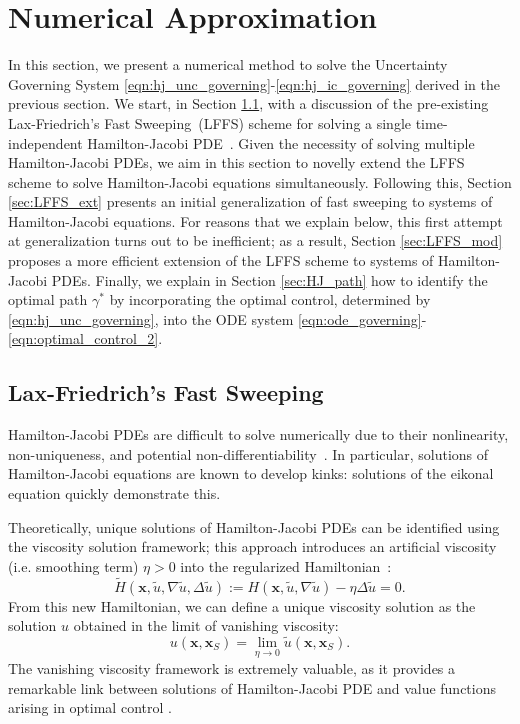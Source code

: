 \documentclass[pdflatex,sn-mathphys-num]{sn-jnl}%
\def \bx{{\mathbf {x}}}
\theoremstyle{thmstyleone}%
\theoremstyle{thmstyletwo}%
\theoremstyle{thmstylethree}%
\begin{document}
\section{Numerical Approximation}
\label{sec:3}

In this section, we present a numerical method to solve the Uncertainty Governing System \eqref{eqn:hj_unc_governing}-\eqref{eqn:hj_ic_governing} derived in the previous section. We start, in Section \ref{sec:LFFS_Intro}, with a discussion of the pre-existing Lax-Friedrich's Fast Sweeping~(LFFS) scheme for solving a single time-independent Hamilton-Jacobi PDE~\cite{Kao2004, Zhao2004}.  Given the necessity of solving multiple Hamilton-Jacobi PDEs, we aim in this section to novelly extend the LFFS scheme to solve Hamilton-Jacobi equations simultaneously.  Following this, Section \ref{sec:LFFS_ext} presents an initial generalization of fast sweeping to systems of Hamilton-Jacobi equations. 
For reasons that we explain below, this first attempt at generalization turns out to be inefficient; as a result, Section \ref{sec:LFFS_mod} proposes a more efficient extension of the LFFS scheme to systems of Hamilton-Jacobi PDEs.  Finally, we explain in Section \ref{sec:HJ_path} how to identify the optimal path $\gamma^*$ by incorporating the optimal control, determined by \eqref{eqn:hj_unc_governing}, into the ODE system \eqref{eqn:ode_governing}-\eqref{eqn:optimal_control_2}.  


\subsection{Lax-Friedrich's Fast Sweeping}
\label{sec:LFFS_Intro}
Hamilton-Jacobi PDEs are difficult to solve numerically due to their nonlinearity, non-uniqueness, and potential non-differentiability~\cite{Crandall1983,Crandall1986}.  In particular, solutions of Hamilton-Jacobi equations are known to develop kinks: solutions of the eikonal equation quickly demonstrate this.  

Theoretically, unique solutions of Hamilton-Jacobi PDEs can be identified using the viscosity solution framework; this approach introduces an artificial viscosity (i.e. smoothing term) $\eta > 0$ into the regularized Hamiltonian~\cite{Evans2010}:
\begin{equation}
    \tilde{H}(\bx,\tilde{u},\nabla\tilde{u},\Delta\tilde{u}):=H(\bx,\tilde{u},\nabla\tilde{u}) - \eta \Delta \tilde{u} = 0.
\end{equation}
From this new Hamiltonian, we can define a unique viscosity solution as the solution $u$ obtained in the limit of vanishing viscosity:
\begin{equation}
    u(\bx,\bx_S) = \lim_{\eta \rightarrow 0} \tilde{u}(\bx,\bx_S).
\end{equation}
The vanishing viscosity framework is extremely valuable, as it provides a remarkable link between solutions of Hamilton-Jacobi PDE and value functions arising in optimal control \cite{Evans2010}.  
  
\end{document}
